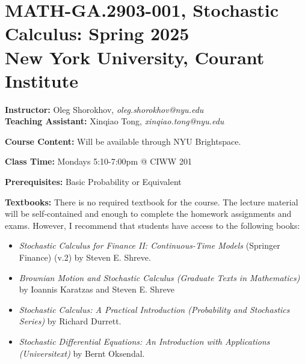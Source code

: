 \documentclass[reqno,psamsfonts, 12pt]{amsart}
\theoremstyle{remark}
\numberwithin{equation}{section}
\begin{document}
\section*{MATH-GA.2903-001, Stochastic Calculus: Spring 2025\\
New York University, Courant Institute}

\bigskip
\bigskip

\noindent \textbf{Instructor:} Oleg Shorokhov, \emph{oleg.shorokhov@nyu.edu}\\

\noindent \textbf{Teaching Assistant:} Xinqiao Tong, \emph{xinqiao.tong@nyu.edu}

\bigskip
\bigskip

\noindent \textbf{Course Content:} Will be available through NYU Brightspace.

\bigskip
\bigskip

\noindent \textbf{Class Time:} Mondays 5:10-7:00pm @ CIWW 201

\bigskip
\bigskip

\noindent \textbf{Prerequisites:} Basic Probability or Equivalent

\bigskip
\bigskip

\noindent \textbf{Textbooks:} There is no required textbook for the course. 
The lecture material will be self-contained and enough to complete the homework assignments and exams. 
However, I recommend that students have access to the following books:

\begin{itemize}
\item \emph{Stochastic Calculus for Finance II: Continuous-Time Models} (Springer Finance) (v.2) by Steven E. Shreve.

\medskip

\item \emph{Brownian Motion and Stochastic Calculus (Graduate Texts in Mathematics)} by Ioannis Karatzas and Steven E. Shreve

\medskip

\item \emph{Stochastic Calculus: A Practical Introduction (Probability and Stochastics Series)} by Richard Durrett.

\medskip

\item \emph{Stochastic Differential Equations: An Introduction with Applications (Universitext)} by Bernt Oksendal.
\end{itemize}
\end{document}
